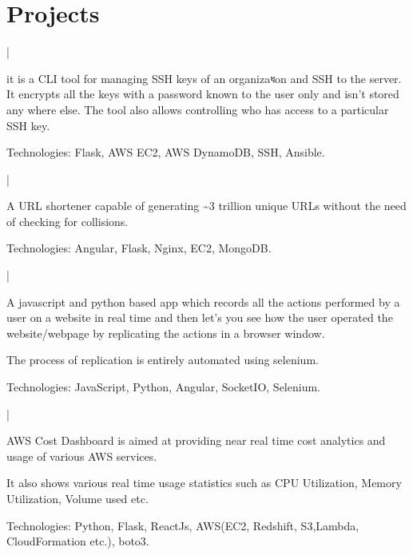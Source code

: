 \documentclass[letterpaper]{main}
\begin{document}
\begin{minipage}[t]{0.66\textwidth}
\section{Projects}

 |
\begin{tightitemize}
\item it is a CLI tool for managing SSH keys of an organizaধon and SSH to
the server. It encrypts all the keys with a password known to the user
only and isn’t stored any where else. The tool also allows controlling
who has access to a particular SSH key. \\
\item Technologies: Flask, AWS EC2, AWS DynamoDB, SSH, Ansible.\\
\end{tightitemize}
\sectionspace 

 |
\begin{tightitemize}
\item A URL shortener capable of generating \textasciitilde3 trillion unique URLs without the need of checking for collisions. \\
\item Technologies: Angular, Flask, Nginx, EC2, MongoDB. \\
\end{tightitemize}
\sectionspace 

 |
\begin{tightitemize}
\item A javascript and python based app which records all the actions performed by a user on a website in real time and then let's you see how the user operated the website/webpage by replicating the actions in a browser window. \\
\item The process of replication is entirely automated using selenium. \\
\item Technologies: JavaScript, Python, Angular, SocketIO, Selenium.
\end{tightitemize}
\sectionspace 

 |
\begin{tightitemize}
\item AWS Cost Dashboard is aimed at providing near real time cost analytics and usage of various AWS services. \\
\item It also shows various real time usage statistics such as CPU Utilization, Memory Utilization, Volume used etc. \\
\item Technologies: Python, Flask, ReactJs, AWS(EC2, Redshift, S3,Lambda, CloudFormation etc.), boto3.
\end{tightitemize}

\end{minipage}
\end{document}
